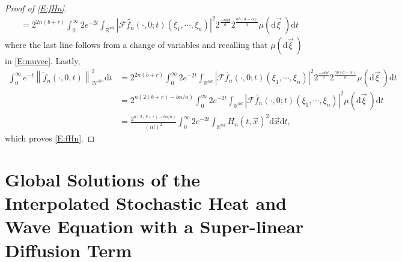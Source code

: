 \documentclass[12pt]{report}
\theoremstyle{plain}
\theoremstyle{definition}
\numberwithin{equation}{section}
\newcommand{\R}{\mathbb{R}}
\newcommand{\Norm}[1]{\left\|  #1   \right\|}
\newcommand{\ud}{\ensuremath{ \mathrm{d} }}
\begin{document}
\begin{proof}[Proof of \eqref{E:fHn}]
\begin{align*}
	& = 2^{2n(b+r)}\int_0^\infty 2e^{-2t} \int_{\R^{nd}} \left| \mathcal{F}\widetilde{f_n}(\cdot,0;t)(\xi_1,\cdots,\xi_n) \right|^2 2^{\frac{-nbd}{a}} 2^{\frac{nb(d-\alpha)}{a}} \mu(\ud \vec{\xi}\:)   \ud t
	\end{align*}
	where the last line follows from a change of variables and recalling that $\mu(\ud \vec{\xi}\:)$
	in \eqref{E:muvec}. Lastly,
	\begin{align*}
	\int_0^\infty e^{-t} \Norm{ \widetilde{f}_n(\cdot,0,t) }_{\mathcal{H}^{\otimes n}}^2 \ud t
	& = 2^{2n(b+r)}\int_0^\infty 2e^{-2t} \int_{\R^{nd}} \left| \mathcal{F}\widetilde{f_n}(\cdot,0;t)(\xi_1,\cdots,\xi_n) \right|^2 2^{\frac{-nbd}{a}} 2^{\frac{nb(d-\alpha)}{a}} \mu(\ud \vec{\xi}\:) \ud t \\
	& = 2^{n(2(b+r) - b\alpha/a)}  \int_0^\infty 2e^{-2t} \int_{\R^{nd}} \left| \mathcal{F}\widetilde{f_n}(\cdot,0;t)(\xi_1,\cdots,\xi_n) \right|^2 \mu(\ud \vec{\xi}\:)   \ud t                             \\
	& = \frac{2^{n(2(b+r) - b\alpha/a)}}{(n!)^2}  \int_0^\infty 2e^{-2t} \int_{\R^{nd}} H_n(t,\vec{x})^2 \ud \vec{x}   \ud t,
	\end{align*}
	which proves \eqref{E:fHn}.
\end{proof}

\chapter{\normalfont Global Solutions of the Interpolated Stochastic Heat and Wave Equation with a Super-linear Diffusion Term} \label{Ch:SupLin}
\end{document}
